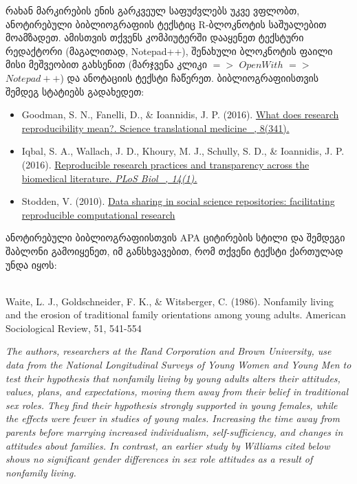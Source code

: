 \documentclass{article}\usepackage[]{graphicx}\usepackage[]{color}
\begin{document}
რახან მარკირების ენის გარკვეულ საფუძვლებს უკვე ვფლობთ, ანოტირებული ბიბლიოგრაფიის ტექსტიც R-ბლოკნოტის საშუალებით მოამზადეთ. ამისთვის თქვენს კომპიუტერში დააყენეთ ტექსტური რედაქტორი (მაგალითად, Notepad++), შენახული ბლოკნოტის ფაილი მისი მეშვეობით გახსენით (მარჯვენა კლიკი $=>$ $Open With$ $=>$ $Notepad++$) და ანოტაციის ტექსტი ჩაწერეთ. ბიბლიოგრაფიისთვის შემდეგ სტატიებს გადახედეთ:

\begin{itemize}
\item{Goodman, S. N., Fanelli, D., & Ioannidis, J. P. (2016). \href{https://www.dropbox.com/s/4io57pvabqw539s/Goodman%2C%202016.pdf?dl=0}{What does research reproducibility mean?. Science translational medicine_, 8(341).}}
\item{Iqbal, S. A., Wallach, J. D., Khoury, M. J., Schully, S. D., & Ioannidis, J. P. (2016). \href{https://www.dropbox.com/s/dgl3tbskfjjn5ib/iqbal_et_al%2C%202016.PDF?dl=0}{Reproducible research practices and transparency across the biomedical literature. \emph{PLoS Biol_, 14(1).}}}
\item{Stodden, V. (2010). \href{https://www.dropbox.com/s/uh7vd6diud8tcyu/Stodden%2C%202010.pdf?dl=0). _NIPS_ 2010.}{Data sharing in social science repositories: facilitating reproducible computational research}}
\end{itemize}



ანოტირებული ბიბლიოგრაფიისთვის APA ციტირების სტილი და შემდეგი შაბლონი გამოიყენეთ, იმ განსხვავებით, რომ თქვენი ტექსტი ქართულად უნდა იყოს:

\\

Waite, L. J., Goldschneider, F. K., & Witsberger, C. (1986). Nonfamily living and the erosion of traditional family orientations among young adults. American Sociological Review, 51, 541-554

\emph{The authors, researchers at the Rand Corporation and Brown University, use data from the National Longitudinal Surveys of Young Women and Young Men to test their hypothesis that nonfamily living by young adults alters their attitudes, values, plans, and expectations, moving them away from their belief in traditional sex roles. They find their hypothesis strongly supported in young females, while the effects were fewer in studies of young males. Increasing the time away from parents before marrying increased individualism, self-sufficiency, and changes in attitudes about families. In contrast, an earlier study by Williams cited below shows no significant gender differences in sex role attitudes as a result of nonfamily living.}
\end{document}

